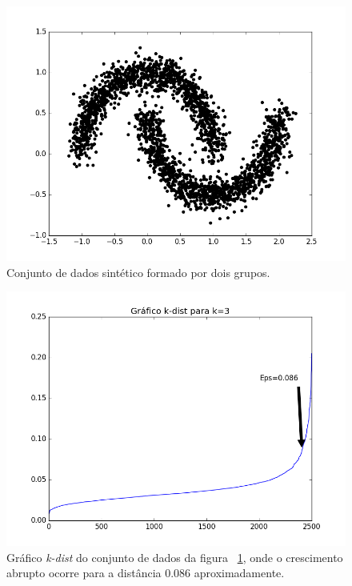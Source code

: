 \begin{figure}[h!]
	\includegraphics[width=\linewidth]{figuras/initial.png}
	\caption{Conjunto de dados sintético formado por dois grupos.}
	\label{fig:inital}
\end{figure}

\begin{figure}[h!]
	\includegraphics[width=\linewidth]{figuras/k_dist.png}
	\caption{Gráfico \emph{k-dist} do conjunto de dados da figura ~\ref{fig:inital}, onde o crescimento abrupto ocorre para a distância 0.086 aproximadamente.}
	\label{fig:k_dist}
\end{figure}

